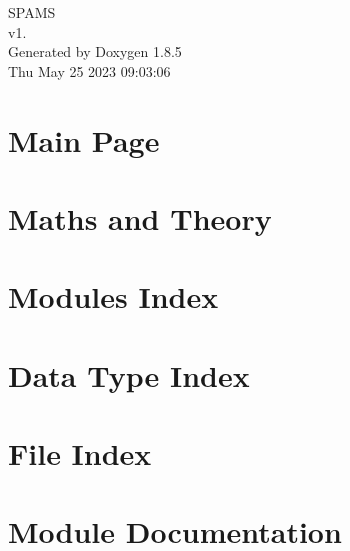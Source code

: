 \documentclass[twoside]{book}
\newcommand{\clearemptydoublepage}{%
  \newpage{\pagestyle{empty}\cleardoublepage}%
}
\begin{document}
\hypersetup{pageanchor=false}
\begin{titlepage}
\vspace*{7cm}
\begin{center}%
{\Large S\-P\-A\-M\-S \\[1ex]\large v1. }\\
\vspace*{1cm}
{\large Generated by Doxygen 1.8.5}\\
\vspace*{0.5cm}
{\small Thu May 25 2023 09:03:06}\\
\end{center}
\end{titlepage}
\clearemptydoublepage
\tableofcontents
\clearemptydoublepage
{}
\hypersetup{pageanchor=true}

\chapter{Main Page}
\label{index}\hypertarget{index}{}
\chapter{Maths and Theory}
\label{md_math}
\hypertarget{md_math}{}

\chapter{Modules Index}

\chapter{Data Type Index}

\chapter{File Index}

\chapter{Module Documentation}











\end{document}
